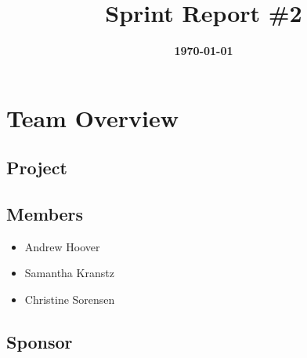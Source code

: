 \documentclass{article}
\title{\normalfont\Large\bfseries\color{TitleColor}Sprint Report \#2}
\date{\normalfont\bfseries\color{TitleColor}\today}
\begin{document}
\maketitle

\section*{Team Overview}
\subsection*{Project}

\subsection*{Members}
\begin{itemize}
	\item Andrew Hoover
	\item Samantha Kranstz
	\item Christine Sorensen
\end{itemize}

\subsection*{Sponsor}
\end{document}
